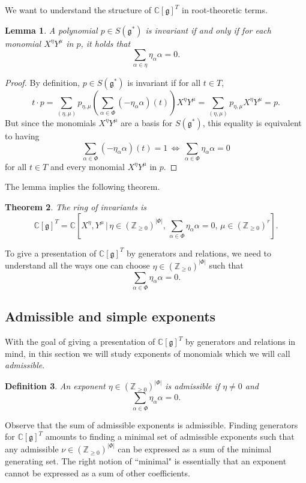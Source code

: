 \documentclass[12pt]{amsart}
\newcommand{\C}{\mathbb{C}}
\newcommand{\Z}{\mathbb{Z}}
\newcommand{\g}{\mathfrak{g}}
\newtheorem{theorem}{Theorem}[subsection]
\newtheorem{definition}[theorem]{Definition}
\newtheorem{lemma}[theorem]{Lemma}
\theoremstyle{remark}
\theoremstyle{remark}
\theoremstyle{remark}
\begin{document}
We want to understand the structure of $\C[\g]^T$ in root-theoretic terms.
\begin{lemma}
A polynomial $p \in S(\g^*)$ is invariant if and only if for each monomial $X^\eta Y^\mu$ in $p$, it holds that
$$\sum_{\alpha\in\eta} \eta_\alpha \alpha = 0.$$
\end{lemma}
\begin{proof}
    By definition, $p \in S(\g^*)$ is invariant if for all $t \in T$,
    $$t\cdot p = \sum_{(\eta, \mu)} p_{\eta,\mu} \left(\sum_{\alpha\in\Phi} (- \eta_\alpha \alpha)(t)\right) X^\eta Y^\mu = \sum_{(\eta, \mu)} p_{\eta,\mu} X^\eta Y^\mu=p.$$
    But since the monomials $X^\eta Y^\mu$ are a basis for $S(\g^*)$, this equality is equivalent to having 
    $$\sum_{\alpha\in\Phi} (- \eta_\alpha \alpha)(t) = 1 \, \iff \, \sum_{\alpha\in\Phi} \eta_\alpha \alpha = 0$$
    for all $t \in T$ and every monomial $X^\eta Y^\mu$ in $p$.
\end{proof}

The lemma implies the following theorem.

\begin{theorem}
    The ring of invariants is
    $$\C[\g]^T = \C\left[X^\eta, Y^\mu \, \Big| \, \eta \in (\Z_{\ge0})^{|\Phi|}, \,\sum_{\alpha\in\Phi} \eta_\alpha \alpha = 0, \, \mu \in (\Z_{\ge0})^r\right].$$
\end{theorem}

To give a presentation of $\C[\g]^T$ by generators and relations, we need to understand all the ways one can choose $\eta \in (\Z_{\ge0})^{|\Phi|}$ such that
$$\sum_{\alpha \in \Phi} \eta_\alpha \alpha = 0.$$

\subsection{Admissible and simple exponents}
With the goal of giving a presentation of $\C[\g]^T$ by generators and relations in mind, in this section we will study exponents of monomials which we will call \emph{admissible}.

\begin{definition}
    An exponent $\eta \in (\Z_{\ge 0})^{|\Phi|}$ is \emph{admissible} if $\eta \ne 0$ and
    $$\sum_{\alpha \in \Phi} \eta_\alpha \alpha = 0.$$
\end{definition}

Observe that the sum of admissible exponents is admissible.
Finding generators for $\C[\g]^T$ amounts to finding a minimal set of admissible exponents such that any admissible $\nu \in (\Z_{\ge0})^{|\Phi|}$ can be expressed as a sum of the minimal generating set.
The right notion of ``minimal" is essentially that an exponent cannot be expressed as a sum of other coefficients.
\end{document}
